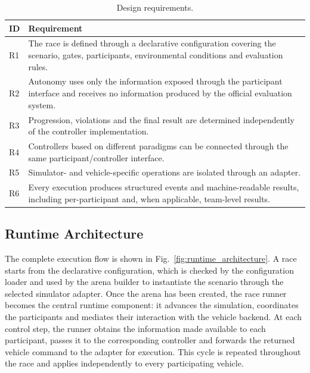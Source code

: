 \begin{table}[t]
\centering
\caption{Design requirements.}
\label{tab:requirements}
\mratablestyle
\begin{tabular}{@{}p{}p{}@{}}
\toprule
ID & Requirement \\
\midrule

R1 &
The race is defined through a declarative configuration covering the scenario,
gates, participants, environmental conditions and evaluation rules. \\

R2 &
Autonomy uses only the information exposed through the participant interface
and receives no information produced by the official evaluation system. \\

R3 &
Progression, violations and the final result are determined independently of the
controller implementation. \\

R4 &
Controllers based on different paradigms can be connected through the same
participant/controller interface. \\

R5 &
Simulator- and vehicle-specific operations are isolated through an adapter. \\

R6 &
Every execution produces structured events and machine-readable results,
including per-participant and, when applicable, team-level results. \\

\bottomrule
\end{tabular}
\end{table}

\subsection{Runtime Architecture}

The complete execution flow is shown in Fig.~\ref{fig:runtime_architecture}.
A race starts from the declarative configuration, which is checked by the
configuration loader and used by the arena builder to instantiate the scenario
through the selected simulator adapter. Once the arena has been created, the
race runner becomes the central runtime component: it advances the simulation,
coordinates the participants and mediates their interaction with the vehicle
backend. At each control step, the runner obtains the information made available
to each participant, passes it to the corresponding controller and forwards the
returned vehicle command to the adapter for execution. This cycle is repeated
throughout the race and applies independently to every participating vehicle.


